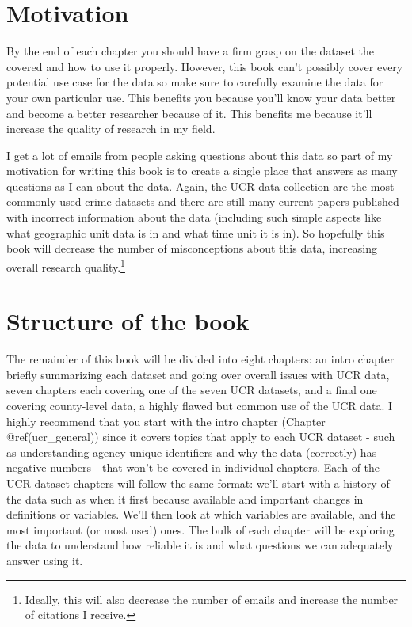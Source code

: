 \documentclass[
  12pt,
  openany]{book}
\begin{document}
\hypertarget{motivation}{%
\section{Motivation}\label{motivation}}

By the end of each chapter you should have a firm grasp on the dataset the covered and how to use it properly. However, this book can't possibly cover every potential use case for the data so make sure to carefully examine the data for your own particular use. This benefits you because you'll know your data better and become a better researcher because of it. This benefits me because it'll increase the quality of research in my field.

I get a lot of emails from people asking questions about this data so part of my motivation for writing this book is to create a single place that answers as many questions as I can about the data. Again, the UCR data collection are the most commonly used crime datasets and there are still many current papers published with incorrect information about the data (including such simple aspects like what geographic unit data is in and what time unit it is in). So hopefully this book will decrease the number of misconceptions about this data, increasing overall research quality.\footnote{Ideally, this will also decrease the number of emails and increase the number of citations I receive.}

\hypertarget{structure-of-the-book}{%
\section{Structure of the book}\label{structure-of-the-book}}

The remainder of this book will be divided into eight chapters: an intro chapter briefly summarizing each dataset and going over overall issues with UCR data, seven chapters each covering one of the seven UCR datasets, and a final one covering county-level data, a highly flawed but common use of the UCR data. I highly recommend that you start with the intro chapter (Chapter @ref(ucr\_general)) since it covers topics that apply to each UCR dataset - such as understanding agency unique identifiers and why the data (correctly) has negative numbers - that won't be covered in individual chapters. Each of the UCR dataset chapters will follow the same format: we'll start with a history of the data such as when it first because available and important changes in definitions or variables. We'll then look at which variables are available, and the most important (or most used) ones. The bulk of each chapter will be exploring the data to understand how reliable it is and what questions we can adequately answer using it.
\end{document}
